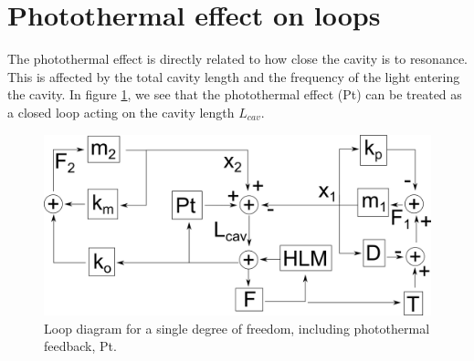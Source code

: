 \section{Photothermal effect on loops}
The photothermal effect is directly related to how close the cavity is to resonance. This is affected by the total cavity length and the frequency of the light entering the cavity. In figure \ref{fig:photothermal_blocks}, we see that the photothermal effect (Pt) can be treated as a closed loop acting on the cavity length $L_{cav}$.

\begin{figure}[htp]
\begin{center}
\includegraphics[width=.9\textwidth]{figures/controls/photothermal_blocks}
\end{center}
\caption[Loop diagram for a single degree of freedom]{%
\label{fig:photothermal_blocks}
Loop diagram for a single degree of freedom, including photothermal feedback, Pt.}
\end{figure}